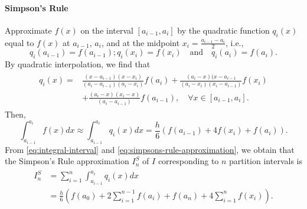 \paragraph{Simpson's Rule}
Approximate $ f(x) $ on the interval $ [a_{i-1}, a_i] $ by the quadratic
    function $ q_i(x) $ equal to $ f(x) $ at $ a_{i-1} $, $ a_i $, and at the
    midpoint $ x_i = \frac{a_{i-1} - a_i}{2} $, i.e.,
\begin{equation*}
    q_i(a_{i-1}) = f(a_{i-1}); q_i(x_i) = f(x_i) \quad \text{and} \quad
        q_i(a_i) = f(a_i).
\end{equation*}
By quadratic interpolation, we find that
\begin{align}
    \begin{split}
        q_i(x)
            =& \frac{(x - a_{i-1})(x - x_i)}{(a_i - a_{i-1})(a_i - x_i)}
                f(a_i) + \frac{(a_i - x)(x - a_{i-1}}{(a_i - x_i)(x_i -
                a_{i-1})} f(x_i) \\
             &+ \frac{(a_i - x)(x_i - x)}{(a_i - a_{i-1})} f(a_{i-1}), \quad
                \forall x \in [a_{i-1}, a_i].
    \end{split}
\end{align}
Then,
\begin{equation}
    \int_{a_{i-1}}^{a_i} f(x) dx \approx \int_{a_{i-1}}^{a_i} q_i(x) dx =
        \frac{h}{6} (f(a_{i-1}) + 4 f(x_i) + f(a_i)).
    \label{eq:simpsons-rule-approximation}
\end{equation}
From \eqref{eq:integral-interval} and \eqref{eq:simpsons-rule-approximation},
    we obtain that the Simpson's Rule approximation $ I_n^S $ of $ I $
    corresponding to $ n $ partition intervals is
\begin{align}
    \begin{split}
        I_n^S
            &= \sum_{i=1}^{n} \int_{a_{i-1}}^{a_i} q_i(x) dx \\
            &= \frac{h}{6} \left( f(a_0) + 2 \sum_{i=1}^{n-1} f(a_i) + f(a_n) +
                4 \sum_{i=1}^{n} f(x_i) \right).
    \end{split}
\end{align}

